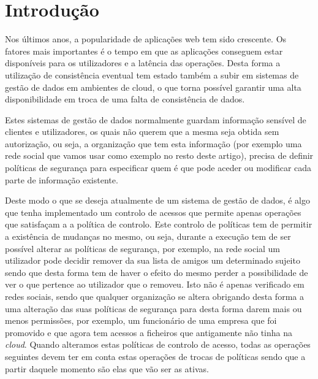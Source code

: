 \documentclass[runningheads,a4paper]{llncs}
\begin{document}

\section{Introdução}\label{sec:intro}

Nos últimos anos, a popularidade de aplicações web tem sido crescente. Os fatores mais importantes 
é o tempo em que as aplicações conseguem estar disponíveis para os utilizadores e a latência das operações. Desta forma a utilização de consistência eventual tem estado também a subir em sistemas de gestão de dados em ambientes de cloud, o que torna possível garantir uma alta disponibilidade em troca de uma falta de consistência de dados.

Estes sistemas de gestão de dados normalmente guardam informação sensível de clientes e utilizadores, os quais não querem que a mesma seja obtida sem autorização, ou seja, a organização que tem esta informação (por exemplo uma rede social que vamos usar como exemplo no resto deste artigo), precisa de definir políticas de segurança para especificar quem é que pode aceder ou modificar cada parte de informação existente.

Deste modo o que se deseja atualmente de um sistema de gestão de dados, é algo que tenha implementado um controlo de acessos que permite apenas operações que satisfaçam a a política de controlo. Este controlo de políticas tem de permitir a existência de mudanças no mesmo, ou seja, durante a execução tem de ser possível alterar as políticas de segurança, por exemplo, na rede social um utilizador pode decidir remover da sua lista de amigos um determinado sujeito sendo que desta forma tem de haver o efeito do mesmo perder a possibilidade de ver o que pertence ao utilizador que o removeu. Isto não é apenas verificado em redes sociais, sendo que qualquer organização se altera obrigando desta forma a uma alteração das suas políticas de segurança para desta forma darem mais ou menos permissões, por exemplo, um funcionário de uma empresa que foi promovido e que agora tem acessos a ficheiros que antigamente não tinha na \textit{cloud}. Quando alteramos estas políticas de controlo de acesso, todas as operações seguintes devem ter em conta estas operações de trocas de políticas sendo que a partir daquele momento são elas que vão ser as ativas.
\end{document}
